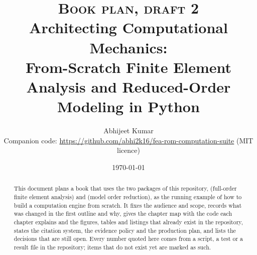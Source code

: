 \documentclass[11pt,a4paper]{article}
\title{{\normalsize\textsc{Book plan, draft 2}}\\[1.5ex]
Architecting Computational Mechanics:\\
From-Scratch Finite Element Analysis and Reduced-Order Modeling in Python}
\author{Abhijeet Kumar\\[2pt]
{\small Companion code: \url{https://github.com/abhi2k16/fea-rom-computation-suite} (MIT licence)}}
\date{\today}
\begin{document}
\maketitle

\begin{abstract}
This document plans a book that uses the two packages of this repository, \fea{} (full-order finite element analysis) and \rom{} (model order reduction), as the running example of how to build a computation engine from scratch. It fixes the audience and scope, records what was changed in the first outline and why, gives the chapter map with the code each chapter explains and the figures, tables and listings that already exist in the repository, states the citation system, the evidence policy and the production plan, and lists the decisions that are still open. Every number quoted here comes from a script, a test or a result file in the repository; items that do not exist yet are marked as such.
\end{abstract}

\tableofcontents
\bigskip










\end{document}
